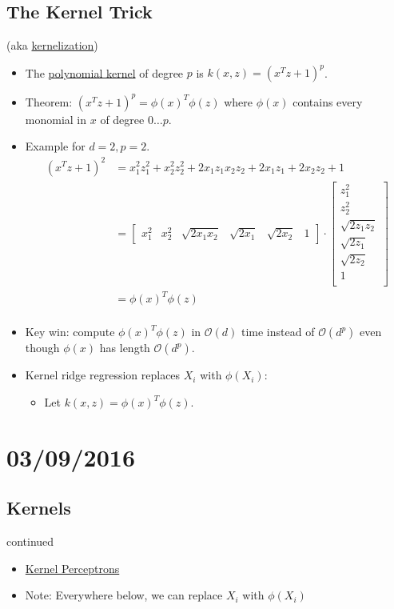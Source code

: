 \documentclass[10pt]{article}
\begin{document}
	\subsection*{The Kernel Trick} (aka \underline{kernelization})
	\
	\begin{itemize}
		\item The \underline{polynomial kernel} of degree $p$ is $k(x,z) = (x^{T}z + 1)^{p}$.
		\item Theorem: $(x^{T}z + 1)^{p} = \phi(x)^{T}\phi(z)$ where $\phi(x)$ contains every monomial in $x$ of degree $0 \dots p$.
		\item Example for $d=2, p=2$.
			\begin{align*}
				(x^{T}z+1)^{2} &= x_{1}^{2}z_{1}^{2} + x_{2}^{2}z_{2}^{2} + 2x_{1}z_{1}x_{2}z_{2} + 2x_{1}z_{1} + 2x_{2}z_{2} + 1\\
					& = \begin{bmatrix}
						x_{1}^{2} & x_{2}^{2} & \sqrt{2x_{1}x_{2}} & \sqrt{2x_{1}} & \sqrt{2x_{2}} & 1
					\end{bmatrix}
					\cdot
					\begin{bmatrix}
						z_{1}^{2}\\
						z_{2}^{2}\\
						\sqrt{2z_{1}z_{2}}\\
						\sqrt{2z_{1}}\\
						\sqrt{2z_{2}}\\
						1\\
					\end{bmatrix}\\
					&= \phi(x)^{T} \phi(z)\\
			\end{align*}
		\item Key win: compute $\phi(x)^{T} \phi(z)$ in $\mathcal{O}(d)$ time instead of $\mathcal{O}(d^{p})$ even though $\phi(x)$ has length $\mathcal{O}(d^{p})$.
		\item Kernel ridge regression replaces $X_{i}$ with $\phi(X_{i})$:
			\begin{itemize}
				\item Let $k(x, z) = \phi(x)^{T}\phi(z)$.	
			\end{itemize} 
	\end{itemize}


\newpage
\section*{03/09/2016}
	\subsection*{Kernels} continued
	\begin{itemize}
		\item \underline{Kernel Perceptrons}
		\item Note: Everywhere below, we can replace $X_{i}$ with $\phi(X_{i})$
		\end{itemize}
\end{document}
